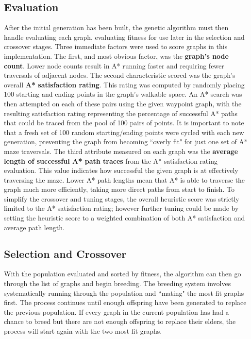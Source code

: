 	\subsection{Evaluation}
	After the initial generation has been built, the genetic algorithm must then handle evaluating each graph, evaluating fitness for use later in the selection and crossover stages. Three immediate factors were used to score graphs in this implementation. The first, and most obvious factor, was the \textbf{graph's node count}. Lower node counts result in A* running faster and requiring fewer traversals of adjacent nodes. The second characteristic scored was the graph's overall \textbf{A* satisfaction rating}. This rating was computed by randomly placing 100 starting and ending points in the graph's walkable space. An A* search was then attempted on each of these pairs using the given waypoint graph, with the resulting satisfaction rating representing the percentage of successful A* paths that could be traced from the pool of 100 pairs of points. It is important to note that a fresh set of 100 random starting/ending points were cycled with each new generation, preventing the graph from becoming ``overly fit" for just one set of A* maze traversals. The third attribute measured on each graph was the \textbf{average length of successful A* path traces} from the A* satisfaction rating evaluation. This value indicates how successful the given graph is at effectively traversing the maze. Lower A* path lengths mean that A* is able to traverse the graph much more efficiently, taking more direct paths from start to finish. To simplify the crossover and tuning stages, the overall heuristic score was strictly limited to the A* satisfaction rating; however further tuning could be made by setting the heuristic score to a weighted combination of both A* satisfaction and average path length.
	
	\subsection{Selection and Crossover}
	With the population evaluated and sorted by fitness, the algorithm can then go through the list of graphs and begin breeding. The breeding system involves systematically running through the population and ``mating" the most fit graphs first. The process continues until enough offspring have been generated to replace the previous population. If every graph in the current population has had a chance to breed but there are not enough offspring to replace their elders, the process will start again with the two most fit graphs.
	
